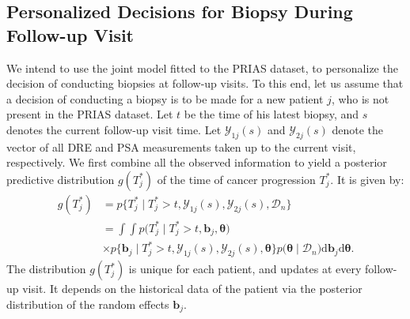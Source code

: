 \subsection{Personalized Decisions for Biopsy During Follow-up Visit}
\label{subsec:pers_decision_making}
We intend to use the joint model fitted to the PRIAS dataset, to personalize the decision of conducting biopsies at follow-up visits. To this end, let us assume that a decision of conducting a biopsy is to be made for a new patient $j$, who is not present in the PRIAS dataset. Let $t$ be the time of his latest biopsy, and $s$ denotes the current follow-up visit time. Let $\mathcal{Y}_{1j}(s)$ and $\mathcal{Y}_{2j}(s)$ denote the vector of all DRE and PSA measurements taken up to the current visit, respectively. We first combine all the observed information to yield a posterior predictive distribution $g(T^*_j)$ of the time of cancer progression $T^*_j$. It is given by:
\begin{equation*}
\label{eq:post_pred_dist}
\begin{aligned}
g(T^*_j) &= p\big\{T^*_j \mid T^*_j > t, \mathcal{Y}_{1j}(s), \mathcal{Y}_{2j}(s), \mathcal{D}_n\big\}\\
&= \int \int p\big(T^*_j \mid T^*_j > t, \boldsymbol{b}_j, \boldsymbol{\theta}\big)\\
&\times p\big\{\boldsymbol{b}_j \mid T^*_j>t, \mathcal{Y}_{1j}(s), \mathcal{Y}_{2j}(s), \boldsymbol{\theta}\big\}p\big(\boldsymbol{\theta} \mid \mathcal{D}_n\big) \mathrm{d} \boldsymbol{b}_j \mathrm{d} \boldsymbol{\theta}.
\end{aligned}
\end{equation*}
The distribution $g(T^*_j)$ is unique for each patient, and updates at every follow-up visit. It depends on the historical data of the patient via the posterior distribution of the random effects $\boldsymbol{b}_j$. 

